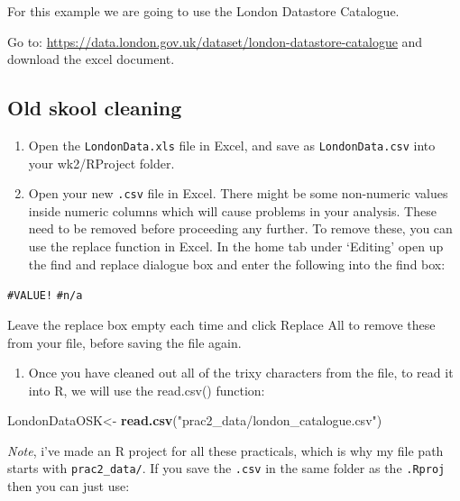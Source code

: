 \documentclass[]{book}
\newenvironment{Shaded}{\begin{snugshade}}{\end{snugshade}}
\newcommand{\KeywordTok}[1]{\textcolor[rgb]{0.13,0.29,0.53}{\textbf{#1}}}
\newcommand{\NormalTok}[1]{#1}
\newcommand{\StringTok}[1]{\textcolor[rgb]{0.31,0.60,0.02}{#1}}
\providecommand{\tightlist}{%
  \setlength{\itemsep}{0pt}\setlength{\parskip}{0pt}}
\begin{document}
For this example we are going to use the London Datastore Catalogue.

Go to: \url{https://data.london.gov.uk/dataset/london-datastore-catalogue} and download the excel document.

\hypertarget{old-skool-cleaning}{%
\subsection{Old skool cleaning}\label{old-skool-cleaning}}

\begin{enumerate}
\def\labelenumi{\arabic{enumi}.}
\setcounter{enumi}{21}
\item
  Open the \texttt{LondonData.xls} file in Excel, and save as \texttt{LondonData.csv} into your wk2/RProject folder.
\item
  Open your new \texttt{.csv} file in Excel. There might be some non-numeric values inside numeric columns which will cause problems in your analysis. These need to be removed before proceeding any further. To remove these, you can use the replace function in Excel. In the home tab under `Editing' open up the find and replace dialogue box and enter the following into the find box:
\end{enumerate}

\texttt{\#VALUE!} \texttt{\#n/a}

Leave the replace box empty each time and click Replace All to remove these from your file, before saving the file again.

\begin{enumerate}
\def\labelenumi{\arabic{enumi}.}
\setcounter{enumi}{23}
\tightlist
\item
  Once you have cleaned out all of the trixy characters from the file, to read it into R, we will use the read.csv() function:
\end{enumerate}

\begin{Shaded}
\begin{Highlighting}[]
\NormalTok{LondonDataOSK<-}\StringTok{ }\KeywordTok{read.csv}\NormalTok{(}\StringTok{"prac2_data/london_catalogue.csv"}\NormalTok{)}
\end{Highlighting}
\end{Shaded}

\emph{Note}, i've made an R project for all these practicals, which is why my file path starts with \texttt{prac2\_data/}. If you save the \texttt{.csv} in the same folder as the \texttt{.Rproj} then you can just use:
\end{document}
